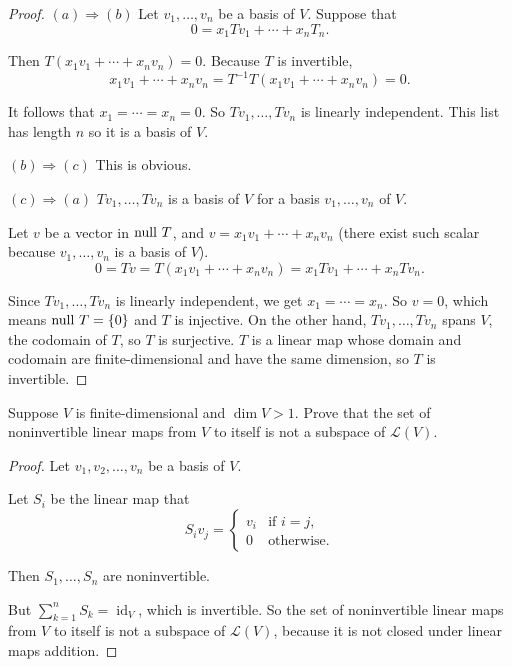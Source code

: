 \begin{proof}
    $(a) \Rightarrow (b)$ Let $v_{1}, \ldots, v_{n}$ be a basis of $V$. Suppose that
    \[
        0 = x_{1}Tv_{1} + \cdots + x_{n}T_{n}.
    \]

    Then $T(x_{1}v_{1} + \cdots + x_{n}v_{n}) = 0$. Because $T$ is invertible,
    \[
        x_{1}v_{1} + \cdots + x_{n}v_{n} = T^{-1}T(x_{1}v_{1} + \cdots + x_{n}v_{n}) = 0.
    \]

    It follows that $x_{1} = \cdots = x_{n} = 0$. So $Tv_{1}, \ldots, Tv_{n}$ is linearly independent. This list has length $n$ so it is a basis of $V$.

    $(b) \Rightarrow (c)$ This is obvious.

    $(c) \Rightarrow (a)$ $Tv_{1}, \ldots, Tv_{n}$ is a basis of $V$ for a basis $v_{1}, \ldots, v_{n}$ of $V$.

    Let $v$ be a vector in $\operatorname{null}\,{T}$, and $v = x_{1}v_{1} + \cdots + x_{n}v_{n}$ (there exist such scalar because $v_{1}, \ldots, v_{n}$ is a basis of $V$).
    \[
        0 = Tv = T(x_{1}v_{1} + \cdots + x_{n}v_{n}) = x_{1}Tv_{1} + \cdots + x_{n}Tv_{n}.
    \]

    Since $Tv_{1}, \ldots, Tv_{n}$ is linearly independent, we get $x_{1} = \cdots = x_{n}$. So $v = 0$, which means $\operatorname{null}\,{T} = \{0\}$ and $T$ is injective. On the other hand, $Tv_{1}, \ldots, Tv_{n}$ spans $V$, the codomain of $T$, so $T$ is surjective. $T$ is a linear map whose domain and codomain are finite-dimensional and have the same dimension, so $T$ is invertible.
\end{proof}
\newpage

\begin{exercise}
    Suppose $V$ is finite-dimensional and $\dim V > 1$. Prove that the set of noninvertible linear maps from $V$ to itself is not a subspace of $\mathcal{L}(V)$.
\end{exercise}

\begin{proof}
    Let $v_{1}, v_{2}, \ldots, v_{n}$ be a basis of $V$.

    Let $S_{i}$ be the linear map that
    \[
        S_{i}v_{j} = \begin{cases}
            v_{i} & \text{if $i = j$}, \\
            0     & \text{otherwise}.
        \end{cases}
    \]

    Then $S_{1}, \ldots, S_{n}$ are noninvertible.

    But $\sum^{n}_{k=1}S_{k} = \operatorname{id}_{V}$, which is invertible. So the set of noninvertible linear maps from $V$ to itself is not a subspace of $\mathcal{L}(V)$, because it is not closed under linear maps addition.
\end{proof}
\newpage

